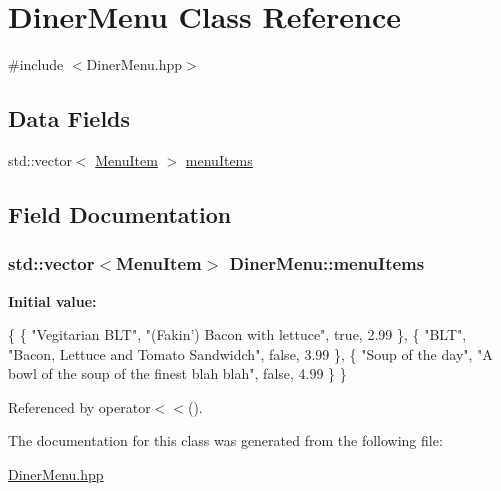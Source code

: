 \hypertarget{classDinerMenu}{\section{Diner\-Menu Class Reference}
\label{classDinerMenu}
}


{\ttfamily \#include $<$Diner\-Menu.\-hpp$>$}

\subsection*{Data Fields}
\begin{DoxyCompactItemize}
\item 
std\-::vector$<$ \hyperlink{classMenuItem}{Menu\-Item} $>$ \hyperlink{classDinerMenu_aae5fb565703a8f251d3271fb83368aa7}{menu\-Items}
\end{DoxyCompactItemize}


\subsection{Field Documentation}
\hypertarget{classDinerMenu_aae5fb565703a8f251d3271fb83368aa7}{
\subsubsection[{menu\-Items}]{\setlength{\rightskip}{0pt plus 5cm}std\-::vector$<${\bf Menu\-Item}$>$ Diner\-Menu\-::menu\-Items}}\label{classDinerMenu_aae5fb565703a8f251d3271fb83368aa7}
{\bfseries Initial value\-:}
\begin{DoxyCode}
 \{
          \{
               \textcolor{stringliteral}{"Vegitarian BLT"},
               \textcolor{stringliteral}{"(Fakin') Bacon with lettuce"},
               \textcolor{keyword}{true},
               2.99
          \},
          \{
               \textcolor{stringliteral}{"BLT"},
               \textcolor{stringliteral}{"Bacon, Lettuce and Tomato Sandwidch"},
               \textcolor{keyword}{false},
               3.99
          \},
          \{
               \textcolor{stringliteral}{"Soup of the day"},
               \textcolor{stringliteral}{"A bowl of the soup of the finest blah blah"},
               \textcolor{keyword}{false},
               4.99
          \}
     \}
\end{DoxyCode}


Referenced by operator$<$$<$().



The documentation for this class was generated from the following file\-:\begin{DoxyCompactItemize}
\item 
\hyperlink{DinerMenu_8hpp}{Diner\-Menu.\-hpp}\end{DoxyCompactItemize}

